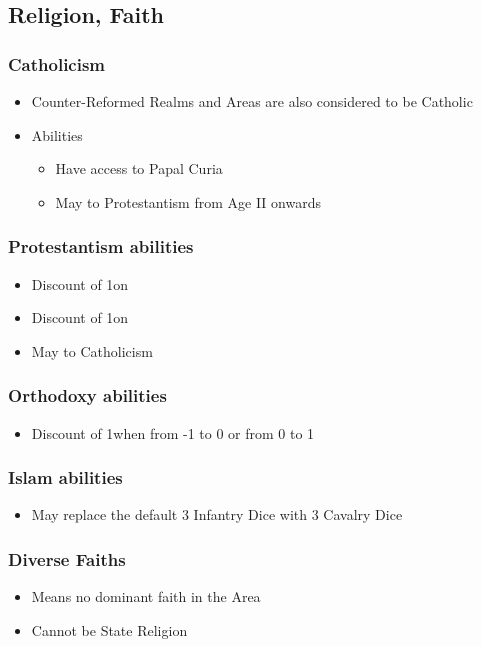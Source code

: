\documentclass[10pt]{article}
\begin{document}
\subsection*{Religion, Faith }
\subsubsection*{Catholicism}
\begin{itemize}
	\item Counter-Reformed Realms and Areas are also considered to be Catholic
	\item Abilities
	\begin{itemize}
		\item Have access to Papal Curia
		\item May  to Protestantism from Age II onwards
	\end{itemize}
\end{itemize}

\subsubsection*{Protestantism abilities}
\begin{itemize}
	\item Discount of 1\adminpower on 
	\item Discount of 1\adminpower on 
	\item May  to Catholicism
\end{itemize}

\subsubsection*{Orthodoxy abilities}
\begin{itemize}
	\item Discount of 1\adminpower when  from -1 to 0 or from 0 to 1
\end{itemize}

\subsubsection*{Islam abilities}
\begin{itemize}
	\item May replace the default 3 Infantry Dice with 3 Cavalry Dice
\end{itemize}

\subsubsection*{Diverse Faiths}
\begin{itemize}
	\item Means no dominant faith in the Area
	\item Cannot be State Religion
\end{itemize}
\end{document}
